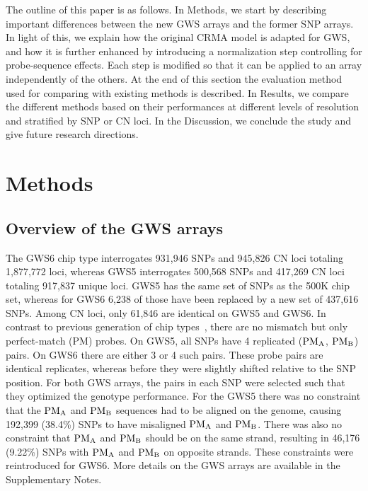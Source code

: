 \documentclass{bioinfo}
\newcommand{\GWS}{GWS\xspace}
\newcommand{\GWSFive}{GWS5\xspace}
\newcommand{\GWSSix}{GWS6\xspace}
\newcommand{\PMA}{\ensuremath{\textnormal{PM}_\textnormal{A}}\xspace}
\newcommand{\PMB}{\ensuremath{\textnormal{PM}_\textnormal{B}}\xspace}
\begin{document}
The outline of this paper is as follows. 
In Methods, we start by describing important differences between the new \GWS arrays and the former SNP arrays.  
In light of this, we explain how the original CRMA model is adapted for \GWS, and how it is further enhanced by introducing a normalization step controlling for probe-sequence effects.  
Each step is modified so that it can be applied to an array independently of the others.
At the end of this section the evaluation method used for comparing with existing methods is described.
In Results, we compare the different methods based on their performances at different levels of resolution and stratified by SNP or CN loci.
In the Discussion, we conclude the study and give future research directions.



\section{Methods}
\subsection{Overview of the \GWS arrays}

The \GWSSix chip type interrogates 931,946 SNPs and 945,826 CN loci totaling 1,877,772 loci, whereas \GWSFive interrogates 500,568 SNPs and 417,269 CN loci totaling 917,837 unique loci.  \GWSFive has the same set of SNPs as the 500K chip set, whereas for \GWSSix 6,238 of those have been replaced by a new set of 437,616 SNPs.  Among CN loci, only 61,846 are identical on \GWSFive and \GWSSix.
%
In contrast to previous generation of chip types~\citep{BengtssonH_etal_2008}, there are no  mismatch but only perfect-match (PM) probes.  
On \GWSFive, all SNPs have 4 replicated (\PMA, \PMB) pairs.  On \GWSSix there are either 3 or 4 such pairs. These probe pairs are identical replicates, whereas before they were slightly shifted relative to the SNP position.
%
For both \GWS arrays, the pairs in each SNP were selected such that they optimized the genotype performance.  For the \GWSFive there was no constraint that the \PMA and \PMB sequences had to be aligned on the genome, causing 192,399 (38.4\%) SNPs to have misaligned \PMA and \PMB.  There was also no constraint that \PMA and \PMB should be on the same strand, resulting in 46,176 (9.22\%) SNPs with \PMA and \PMB on opposite strands.  These constraints were reintroduced for \GWSSix.
More details on the \GWS arrays are available in the Supplementary Notes.
\end{document}
